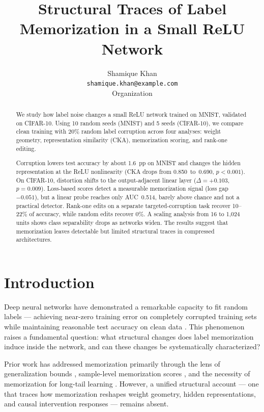 \documentclass{article}
\title{Structural Traces of Label Memorization in a Small ReLU Network}
\author{
  Shamique Khan \\
  \texttt{shamique.khan@example.com} \\
  Organization
}
\begin{document}
\maketitle

\begin{abstract}
We study how label noise changes a small ReLU network trained on MNIST, validated on CIFAR-10. Using 10 random seeds (MNIST) and 5 seeds (CIFAR-10), we compare clean training with 20\% random label corruption across four analyses: weight geometry, representation similarity (CKA), memorization scoring, and rank-one editing.

Corruption lowers test accuracy by about 1.6~pp on MNIST and changes the hidden representation at the ReLU nonlinearity (CKA drops from 0.850~to~0.690, $p<0.001$). On CIFAR-10, distortion shifts to the output-adjacent linear layer ($\Delta=+0.103$, $p=0.009$). Loss-based scores detect a measurable memorization signal (loss gap $-0.051$), but a linear probe reaches only AUC~0.514, barely above chance and not a practical detector. Rank-one edits on a separate targeted-corruption task recover 10--22\% of accuracy, while random edits recover 0\%. A scaling analysis from 16 to 1,024 units shows class separability drops as networks widen. The results suggest that memorization leaves detectable but limited structural traces in compressed architectures.
\end{abstract}

\section{Introduction}
\label{sec:introduction}

Deep neural networks have demonstrated a remarkable capacity to fit random labels — achieving near-zero training error on completely corrupted training sets while maintaining reasonable test accuracy on clean data \cite{zhang2017understanding}. This phenomenon raises a fundamental question: what structural changes does label memorization induce inside the network, and can these changes be systematically characterized?

Prior work has addressed memorization primarily through the lens of generalization bounds \cite{neyshabur2017exploring, arora2018stronger}, sample-level memorization scores \cite{feldman2020what, carlini2022quantifying}, and the necessity of memorization for long-tail learning \cite{feldman2020does}. However, a unified structural account — one that traces how memorization reshapes weight geometry, hidden representations, and causal intervention responses — remains absent.
\end{document}
